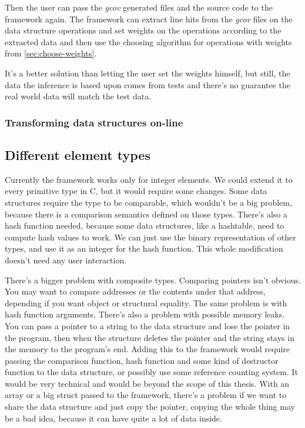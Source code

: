 \documentclass[a4paper,11pt]{article}
\begin{document}
			Then the user can pass the \emph{gcov} generated files and the source code to the framework
			again. The framework can extract line hits from the \emph{gcov} files on the data structure
			operations and set weights on the operations according to the extracted data and then use the
			choosing algorithm for operations with weights from \autoref{sec:choose-weights}.

			It's a better solution than letting the user set the weights himself, but still, the data the
			inference is based upon comes from tests and there's no guarantee the real world data will
			match the test data.

		\subsubsection{Transforming data structures on-line} \label{sec:transforming-on-line}


	\subsection{Different element types}

		Currently the framework works only for integer elements. We could extend it to every primitive type in
		C, but it would require some changes.  Some data structures require the type to be comparable, which
		wouldn't be a big problem, because there is a comparison semantics defined on those types. There's also
		a hash function needed, because some data structures, like a hashtable, need to compute hash values to
		work. We can just use the binary representation of other types, and use it as an integer for the hash
		function. This whole modification doesn't need any user interaction.

		There's a bigger problem with composite types. Comparing pointers isn't obvious. You may want to compare
		addresses or the contents under that address, depending if you want object or structural equality. The
		same problem is with hash function arguments. There's also a problem with possible memory leaks. You can
		pass a pointer to a string to the data structure and lose the pointer in the program, then when the
		structure deletes the pointer and the string stays in the memory to the program's end. Adding this to
		the framework would require passing the comparison function, hash function and some kind of destructor
		function to the data structure, or possibly use some reference counting system. It would be very
		technical and would be beyond the scope of this thesis. With an array or a big struct passed to the
		framework, there's a problem if we want to share the data structure and just copy the pointer, copying
		the whole thing may be a bad idea, because it can have quite a lot of data inside.
\end{document}
